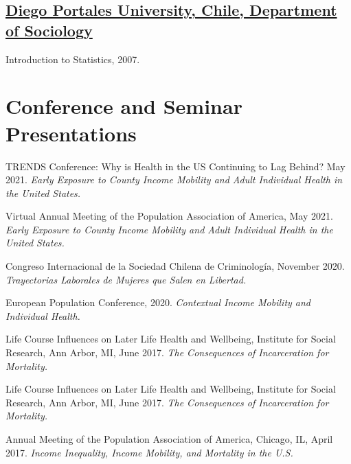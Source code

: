 \documentclass[10pt,letterpaper]{article}
\renewenvironment{itemize}{
  \begin{list}{}{
    \setlength{\leftmargin}{1.5em}
    \setlength{\itemsep}{0.25em}
    \setlength{\parskip}{0pt}
    \setlength{\parsep}{0.25em}
  }
}{
  \end{list}
}
\begin{document}
\subsection*{\href{http://www.udp.cl/facultades_carreras/ciencias_sociales-historia/}{Diego Portales University, Chile, Department of Sociology}}

\begin{itemize}
\item Introduction to Statistics, 2007.
\end{itemize}


\section*{Conference and Seminar Presentations}

\begin{itemize}

\item TRENDS Conference: Why is Health in the US Continuing to Lag Behind? May 2021. {\textit{Early Exposure to County Income Mobility and Adult Individual Health in the United States.}}

\item Virtual Annual Meeting of the Population Association of America, May 2021. {\textit{Early Exposure to County Income Mobility and Adult Individual Health in the United States.}}

\item Congreso Internacional de la Sociedad Chilena de Criminología, November 2020. {\textit{Trayectorias Laborales de Mujeres que Salen en
Libertad.}}

\item European Population Conference, 2020. {\textit{Contextual Income Mobility and Individual Health.}}

\item Life Course Influences on Later Life Health and Wellbeing, Institute for Social Research, Ann Arbor, MI, June 2017. {\textit{The Consequences of Incarceration for Mortality.}}


\item Life Course Influences on Later Life Health and Wellbeing, Institute for Social Research, Ann Arbor, MI, June 2017. {\textit{The Consequences of Incarceration for Mortality.}}


\item  Annual Meeting of the Population Association of America, Chicago, IL, April 2017. {\textit{Income Inequality, Income Mobility, and Mortality in the U.S.}}


\end{itemize}
\end{document}
